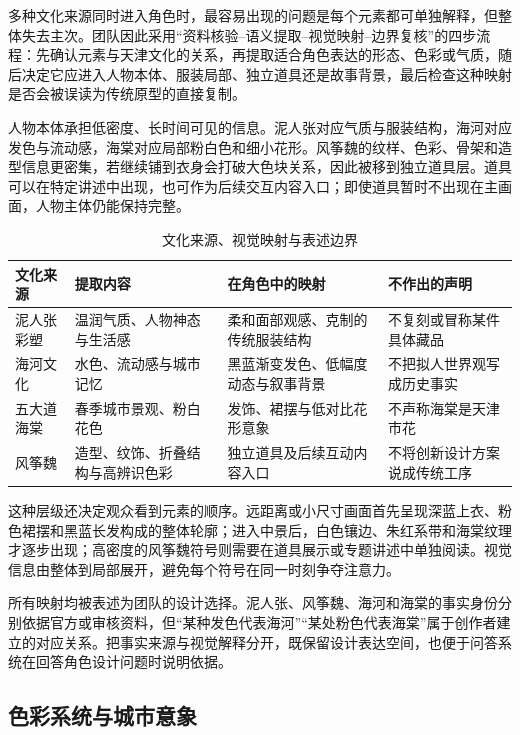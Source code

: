 \documentclass[UTF8,zihao=-4,fontset=none,twoside]{ctexart}
\begin{document}
多种文化来源同时进入角色时，最容易出现的问题是每个元素都可单独解释，但整体失去主次。团队因此采用“资料核验--语义提取--视觉映射--边界复核”的四步流程：先确认元素与天津文化的关系，再提取适合角色表达的形态、色彩或气质，随后决定它应进入人物本体、服装局部、独立道具还是故事背景，最后检查这种映射是否会被误读为传统原型的直接复制。

人物本体承担低密度、长时间可见的信息。泥人张对应气质与服装结构，海河对应发色与流动感，海棠对应局部粉白色和细小花形。风筝魏的纹样、色彩、骨架和造型信息更密集，若继续铺到衣身会打破大色块关系，因此被移到独立道具层。道具可以在特定讲述中出现，也可作为后续交互内容入口；即使道具暂时不出现在主画面，人物主体仍能保持完整。

\begin{table}[htbp]
\centering
\caption{文化来源、视觉映射与表述边界}
\label{tab:visual-translation}
\small
\begin{tabularx}{\linewidth}{@{}P{25mm}P{34mm}Y Y@{}}
\toprule
文化来源 & 提取内容 & 在角色中的映射 & 不作出的声明 \\
\midrule
泥人张彩塑 & 温润气质、人物神态与生活感 & 柔和面部观感、克制的传统服装结构 & 不复刻或冒称某件具体藏品 \\
海河文化 & 水色、流动感与城市记忆 & 黑蓝渐变发色、低幅度动态与叙事背景 & 不把拟人世界观写成历史事实 \\
五大道海棠 & 春季城市景观、粉白花色 & 发饰、裙摆与低对比花形意象 & 不声称海棠是天津市花 \\
风筝魏 & 造型、纹饰、折叠结构与高辨识色彩 & 独立道具及后续互动内容入口 & 不将创新设计方案说成传统工序 \\
\bottomrule
\end{tabularx}
\end{table}

这种层级还决定观众看到元素的顺序。远距离或小尺寸画面首先呈现深蓝上衣、粉色裙摆和黑蓝长发构成的整体轮廓；进入中景后，白色镶边、朱红系带和海棠纹理才逐步出现；高密度的风筝魏符号则需要在道具展示或专题讲述中单独阅读。视觉信息由整体到局部展开，避免每个符号在同一时刻争夺注意力。

所有映射均被表述为团队的设计选择。泥人张、风筝魏、海河和海棠的事实身份分别依据官方或审核资料\cite{ihchinaNiren,ihchinaKite,tianjinHaihe,tianjinBegonia}，但“某种发色代表海河”“某处粉色代表海棠”属于创作者建立的对应关系。把事实来源与视觉解释分开，既保留设计表达空间，也便于问答系统在回答角色设计问题时说明依据。

\subsection{色彩系统与城市意象}
\end{document}
